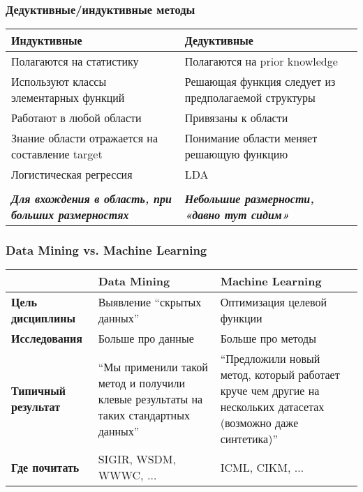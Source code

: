 \documentclass[14pt, fleqn, xcolor={dvipsnames, table}]{beamer}
\begin{document}
\begin{frame}
\frametitle{Дедуктивные/индуктивные методы}
\begin{center}
\footnotesize
\begin{tabular}{p{}|p{}}
\rowcolor{Blue!20}
\small Индуктивные & \small Дедуктивные \\
\hline 
Полагаются на статистику & Полагаются на prior knowledge \\ 
Используют классы элементарных функций & Решающая функция следует из предполагаемой структуры \\
Работают в любой области & Привязаны к области \\ 
Знание области отражается на составление target & Понимание области меняет решающую функцию \\
Логистическая регрессия & LDA \\
&\\
\bf \em Для вхождения в область, при больших размерностях & \bf \em Небольшие размерности, «давно тут сидим» \\
\end{tabular}
\end{center}
\end{frame}

\begin{frame}
\frametitle{Data Mining vs. Machine Learning}
\begin{center}
\footnotesize
\begin{tabular}{p{}|p{}|p{}}
\rowcolor{Blue!20}
& \small Data Mining & \small Machine Learning \\
\hline 
\bf Цель дисциплины & Выявление ``скрытых данных'' & Оптимизация целевой функции \\		
\bf Исследования & Больше про данные & Больше про методы \\
\bf Типичный результат & ``Мы применили такой метод и получили клевые результаты на таких стандартных данных'' & ``Предложили новый метод, который работает круче чем другие на нескольких датасетах (возможно даже синтетика)'' \\
\bf Где почитать & SIGIR, WSDM, WWWC, $\ldots$ & ICML, CIKM, $\ldots$ \\
\end{tabular}
\end{center}
\end{frame}
\end{document}
